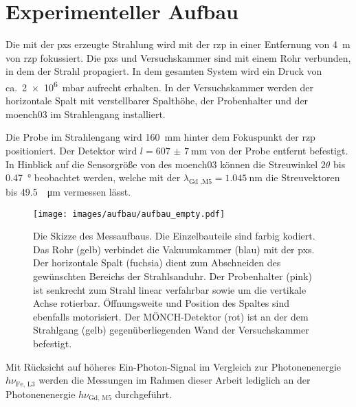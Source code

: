 \chapter{Experimenteller Aufbau}
Die mit der \gls{pxs} erzeugte Strahlung wird mit der \gls{rzp} in einer Entfernung von \SI{4}{\meter} von \gls{rzp} fokussiert. Die \gls{pxs} und Versuchskammer sind mit einem Rohr verbunden, in dem der Strahl propagiert. In dem gesamten System wird ein Druck von ca.\ \SI{2e6}{\milli\bar} aufrecht erhalten. In der Versuchskammer werden der horizontale Spalt mit verstellbarer Spalthöhe, der Probenhalter und der \gls{moench03} im Strahlengang installiert.

\noindent
Die Probe im Strahlengang wird \SI{160}{\milli\meter} hinter dem Fokuspunkt der \gls{rzp} positioniert. Der Detektor wird $l = \SI{607(7)}{\milli\meter}$ von der Probe entfernt befestigt. In Hinblick auf die Sensorgröße von  des \gls{moench03} können die Streuwinkel $2\theta$ bis \SI{0.47}{\degree} beobachtet werden, welche mit der $\lambda_\text{Gd ,M5} = \SI{1.045}{\nano\meter}$ die Streuvektoren bis \SI{49,5}{\per\micro\meter} vermessen lässt.
\begin{figure}[H]
    \centering
    \texttt{[image: images/aufbau/aufbau\_empty.pdf]}
    \caption{Die Skizze des Messaufbaus. Die Einzelbauteile sind farbig kodiert. Das Rohr (gelb) verbindet die Vakuumkammer (blau) mit der \gls{pxs}. Der horizontale Spalt (fuchsia) dient zum Abschneiden des gewünschten Bereichs der Strahlsanduhr. Der Probenhalter (pink) ist senkrecht zum Strahl linear verfahrbar sowie um die vertikale Achse rotierbar. Öffnungsweite und Position des Spaltes sind ebenfalls motorisiert. Der MÖNCH-Detektor (rot) ist an der dem Strahlgang (gelb) gegenüberliegenden Wand der Versuchskammer befestigt.}
    \label{fig:anlage}
\end{figure}
\noindent
Mit Rücksicht auf höheres Ein-Photon-Signal im Vergleich zur Photonenenergie $h\nu_\text{Fe, L3}$ werden die Messungen im Rahmen dieser Arbeit lediglich an der Photonenenergie $h\nu_\text{Gd, M5}$ durchgeführt.

